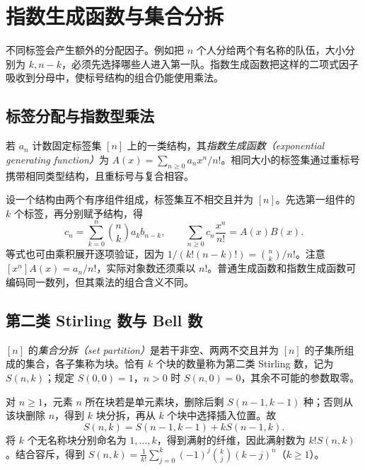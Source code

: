 \setcounter{chapter}{7} %
\chapter{指数生成函数与集合分拆}
\label{ch:egf}

不同标签会产生额外的分配因子。例如把 $n$ 个人分给两个有名称的队伍，大小分别为 $k,n-k$，必须先选择哪些人进入第一队。指数生成函数把这样的二项式因子吸收到分母中，使标号结构的组合仍能使用乘法。

\section{标签分配与指数型乘法}

\begin{definition}
若 $a_n$ 计数固定标签集 $[n]$ 上的一类结构，其\emph{指数生成函数（exponential generating function）}为 $A(x)=\sum_{n\ge0}a_nx^n/n!$。相同大小的标签集通过重标号携带相同类型结构，且重标号与复合相容。
\end{definition}

设一个结构由两个有序组件组成，标签集互不相交且并为 $[n]$。先选第一组件的 $k$ 个标签，再分别赋予结构，得
\begin{equation}
 c_n=\sum_{k=0}^n\binom nk a_kb_{n-k},\qquad
 \sum_{n\ge0}c_n\frac{x^n}{n!}=A(x)B(x).
 \label{eq:egf-product}
\end{equation}
等式也可由乘积展开逐项验证，因为 $1/(k!(n-k)!)=\binom nk/n!$。注意 $[x^n]A(x)=a_n/n!$，实际对象数还须乘以 $n!$。普通生成函数和指数生成函数可编码同一数列，但其乘法的组合含义不同。

\section{第二类 Stirling 数与 Bell 数}

\begin{definition}
$[n]$ 的\emph{集合分拆（set partition）}是若干非空、两两不交且并为 $[n]$ 的子集所组成的集合，各子集称为块。恰有 $k$ 个块的数量称为第二类 Stirling 数，记为 $S(n,k)$；规定 $S(0,0)=1$，$n>0$ 时 $S(n,0)=0$，其余不可能的参数取零。
\end{definition}

对 $n\ge1$，元素 $n$ 所在块若是单元素块，删除后剩 $S(n-1,k-1)$ 种；否则从该块删除 $n$，得到 $k$ 块分拆，再从 $k$ 个块中选择插入位置。故
\[
 S(n,k)=S(n-1,k-1)+kS(n-1,k).
\]
将 $k$ 个无名称块分别命名为 $1,\ldots,k$，得到满射的纤维，因此满射数为 $k!S(n,k)$。结合容斥，得到 $S(n,k)=\frac1{k!}\sum_{j=0}^k(-1)^j\binom kj(k-j)^n$（$k\ge1$）。

